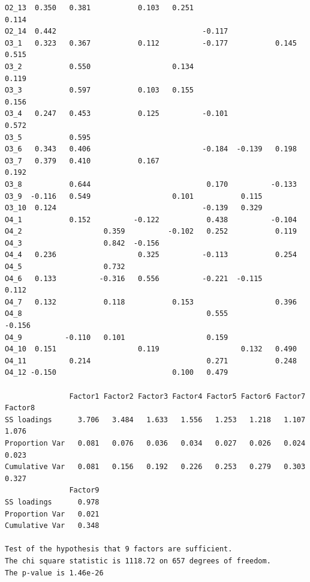 \documentclass[
  letterpaper,
  DIV=11,
  numbers=noendperiod]{scrartcl}
\begin{document}
\begin{verbatim}
O2_13  0.350   0.381           0.103   0.251                           0.114 
O2_14  0.442                                  -0.117                         
O3_1   0.323   0.367           0.112          -0.177           0.145   0.515 
O3_2           0.550                   0.134                           0.119 
O3_3           0.597           0.103   0.155                           0.156 
O3_4   0.247   0.453           0.125          -0.101                   0.572 
O3_5           0.595                                                         
O3_6   0.343   0.406                          -0.184  -0.139   0.198         
O3_7   0.379   0.410           0.167                                   0.192 
O3_8           0.644                           0.170          -0.133         
O3_9  -0.116   0.549                   0.101           0.115                 
O3_10  0.124                                  -0.139   0.329                 
O4_1           0.152          -0.122           0.438          -0.104         
O4_2                   0.359          -0.102   0.252           0.119         
O4_3                   0.842  -0.156                                         
O4_4   0.236                   0.325          -0.113           0.254         
O4_5                   0.732                                                 
O4_6   0.133          -0.316   0.556          -0.221  -0.115           0.112 
O4_7   0.132           0.118           0.153                   0.396         
O4_8                                           0.555                  -0.156 
O4_9          -0.110   0.101                   0.159                         
O4_10  0.151                   0.119                   0.132   0.490         
O4_11          0.214                           0.271           0.248         
O4_12 -0.150                           0.100   0.479                         

               Factor1 Factor2 Factor3 Factor4 Factor5 Factor6 Factor7 Factor8
SS loadings      3.706   3.484   1.633   1.556   1.253   1.218   1.107   1.076
Proportion Var   0.081   0.076   0.036   0.034   0.027   0.026   0.024   0.023
Cumulative Var   0.081   0.156   0.192   0.226   0.253   0.279   0.303   0.327
               Factor9
SS loadings      0.978
Proportion Var   0.021
Cumulative Var   0.348

Test of the hypothesis that 9 factors are sufficient.
The chi square statistic is 1118.72 on 657 degrees of freedom.
The p-value is 1.46e-26 
\end{verbatim}
\end{document}
